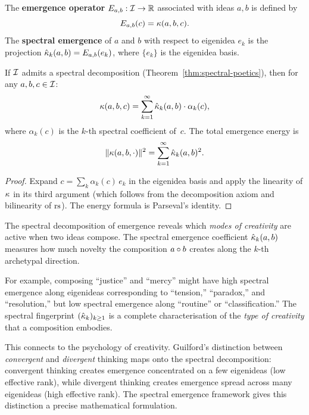 \begin{definition}
\label{def:emergence-operator}
The \textbf{emergence operator} $E_{a,b} : \mathcal{I} \to \mathbb{R}$ associated with
ideas $a, b$ is defined by
\[
  E_{a,b}(c) = \kappa(a, b, c).
\]
The \textbf{spectral emergence} of $a$ and $b$ with respect to eigenidea
$e_k$ is the projection $\hat{\kappa}_k(a,b) = E_{a,b}(e_k)$, where
$\{e_k\}$ is the eigenidea basis.
\end{definition}

\begin{theorem}
\label{thm:spectral-emergence}
If $\mathcal{I}$ admits a spectral decomposition (Theorem~\ref{thm:spectral-poetics}),
then for any $a, b, c \in \mathcal{I}$:
\[
  \kappa(a,b,c) = \sum_{k=1}^{\infty}
  \hat{\kappa}_k(a,b) \cdot \alpha_k(c),
\]
where $\alpha_k(c)$ is the $k$-th spectral coefficient of~$c$.
The total emergence energy is
\[
  \|\kappa(a,b,\cdot)\|^2
  = \sum_{k=1}^{\infty} \hat{\kappa}_k(a,b)^2.
\]
\end{theorem}

\begin{proof}
Expand $c = \sum_k \alpha_k(c)\, e_k$ in the eigenidea basis and apply
the linearity of $\kappa$ in its third argument (which follows from
the decomposition axiom and bilinearity of $\mathrm{rs}$).  The energy formula
is Parseval's identity.
\end{proof}

\begin{interpretation}
The spectral decomposition of emergence reveals which \emph{modes of
creativity} are active when two ideas compose.  The spectral emergence
coefficient $\hat{\kappa}_k(a,b)$ measures how much novelty the
composition $a \circ b$ creates along the $k$-th archetypal
direction.

For example, composing ``justice'' and ``mercy'' might have high spectral
emergence along eigenideas corresponding to ``tension,'' ``paradox,''
and ``resolution,'' but low spectral emergence along ``routine'' or
``classification.''  The spectral fingerprint $(\hat{\kappa}_k)_{k \ge 1}$
is a complete characterisation of the \emph{type of creativity} that a
composition embodies.

This connects to the psychology of creativity.  Guilford's distinction
between \emph{convergent} and \emph{divergent} thinking maps onto the
spectral decomposition: convergent thinking creates emergence concentrated
on a few eigenideas (low effective rank), while divergent thinking creates
emergence spread across many eigenideas (high effective rank).  The
spectral emergence framework gives this distinction a precise
mathematical formulation.
\end{interpretation}

